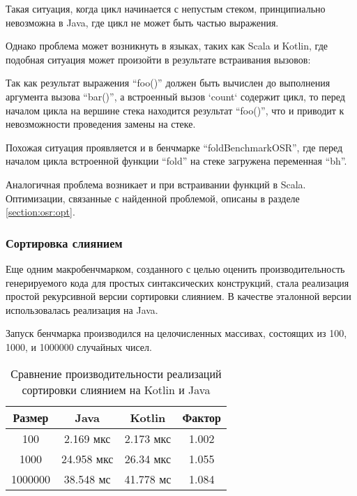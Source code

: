 \begin{verbatim}

\end{verbatim}

Такая ситуация, когда цикл начинается с непустым стеком, принципиально невозможна в Java, где
цикл не может быть частью выражения.

Однако проблема может возникнуть в языках, таких как Scala и Kotlin, где подобная ситуация
может произойти в результате встраивания вызовов:

Так как результат выражения ``foo()'' должен быть вычислен до выполнения аргумента вызова
``bar()'', а встроенный вызов `count` содержит цикл, то перед началом цикла на вершине стека
находится результат ``foo()'', что и приводит к невозможности проведения замены на стеке.

Похожая ситуация проявляется и в бенчмарке ``foldBenchmarkOSR'', где перед началом
цикла встроенной функции ``fold'' на стеке загружена переменная ``bh''.

Аналогичная проблема возникает и при встраивании функций в Scala.
Оптимизации, связанные с найденной проблемой, описаны в разделе \ref{section:osr:opt}.

\subsubsection{Сортировка слиянием}
Еще одним макробенчмарком, созданного с целью оценить производительность генерируемого
кода для простых синтаксических конструкций, стала реализация простой рекурсивной версии
сортировки слиянием.
В качестве эталонной версии использовалась реализация на Java.

Запуск бенчмарка производился на целочисленных массивах, состоящих из 100, 1000, и 1000000 случайных
чисел.

\begin{table}[h]
\begin{center}
\begin{tabular}{|c|c|c|c|} \hline
Размер & Java & Kotlin & Фактор \\ \hline
100 & 2.169 мкс & 2.173 мкс & 1.002\\ \hline
1000 & 24.958 мкс & 26.34 мкс & 1.055\\ \hline
1000000 & 38.548 мс & 41.778 мс & 1.084\\ \hline
\end{tabular}
\caption{Сравнение производительности реализаций сортировки слиянием на Kotlin и Java}
\label{bm:mergesort}
\end{center}
\end{table}


